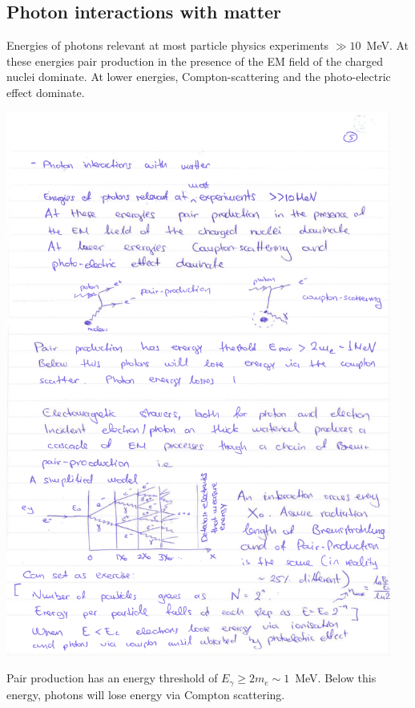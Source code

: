 \subsection{Photon interactions with matter}
Energies of photons relevant at most particle physics experiments $\gg10$~MeV.
At these energies pair production in the presence of the EM field of the charged nuclei dominate. At lower energies, Compton-scattering and the photo-electric effect dominate.
\begin{center}
\includegraphics[width=0.95\textwidth]{fig/detector/photon_interactions.pdf}
\end{center}
Pair production has an energy threshold of $E_{\gamma}\geq 2m_{e}\sim1$~MeV. Below this energy, photons will lose energy via Compton scattering.
